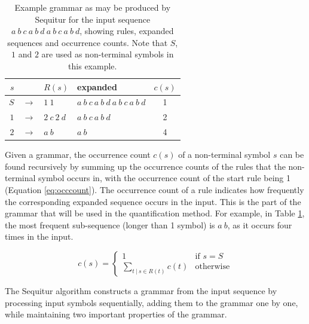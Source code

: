 \documentclass[conference,a4paper,twoside]{IEEEtran}
\newcommand\given[1][]{\:#1\vert\:}
\begin{document}
\begin{table}
    \centering
    \caption{Example grammar as may be produced by Sequitur for the input sequence $a\ b\ c\ a\ b\ d\ a\ b\ c\ a\ b\ d$, showing rules, expanded sequences and occurrence counts. Note that $S$, $1$ and $2$ are used as non-terminal symbols in this example.}
    \begin{tabular}{rcllc}
        $s$ & & $R(s)$ & expanded & $c(s)$ \\\hline
        $S$ & $\rightarrow$ & $1\ 1$ & $a\ b\ c\ a\ b\ d\ a\ b\ c\ a\ b\ d$ & 1 \\
        $1$ & $\rightarrow$ & $2\ c\ 2\ d$ & $a\ b\ c\ a\ b\ d$ & 2 \\
        $2$ & $\rightarrow$ & $a\ b$ & $a\ b$ & 4 \\
    \end{tabular}
    \label{tab:grammar}
\end{table}

Given a grammar, the occurrence count $c(s)$ of a non-terminal symbol $s$ can be found recursively by summing up the occurrence counts of the rules that the non-terminal symbol occurs in, with the occurrence count of the start rule being 1 (Equation \ref{eq:occcount}). The occurrence count of a rule indicates how frequently the corresponding expanded sequence occurs in the input. This is the part of the grammar that will be used in the quantification method. For example, in Table \ref{tab:grammar}, the most frequent sub-sequence (longer than 1 symbol) is $a\ b$, as it occurs four times in the input.

\begin{equation}
    \label{eq:occcount}
    c(s) =
    \begin{cases}
        1 & \text{if } s = S \\
        \sum_{t \given s \in R(t)} c(t) & \text{otherwise}
    \end{cases}
\end{equation}

The Sequitur algorithm constructs a grammar from the input sequence by processing input symbols sequentially, adding them to the grammar one by one, while maintaining two important properties of the grammar.
\end{document}

